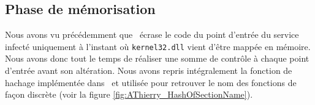 % 
% 
% 
% 
% 
% 

\subsection{Phase de mémorisation}
Nous avons vu précédemment que \Duqu\ écrase le code du point d'entrée du service infecté uniquement à l'instant où \texttt{kernel32.dll} vient d'être mappée en mémoire. Nous avons donc tout le temps de réaliser une somme de contrôle à chaque point d'entrée avant son altération. Nous avons repris intégralement la fonction de hachage implémentée dans \Duqu\ et utilisée pour retrouver le nom des fonctions de façon discrète (voir la figure \ref{fig:AThierry_HashOfSectionName}).   


